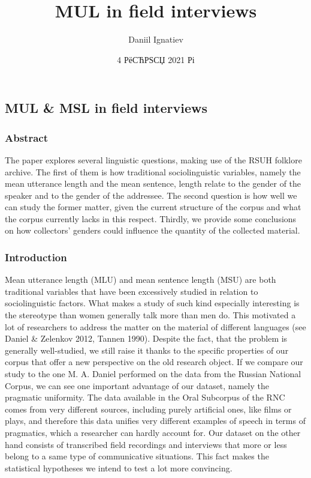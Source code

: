 \documentclass[
]{article}
\title{MUL in field interviews}
\author{Daniil Ignatiev}
\date{4 РёСЋРЅСЏ 2021 Рі}
\begin{document}
\maketitle

\hypertarget{mul-msl-in-field-interviews}{%
\subsection{MUL \& MSL in field
interviews}\label{mul-msl-in-field-interviews}}

\hypertarget{abstract}{%
\subsubsection{Abstract}\label{abstract}}

The paper explores several linguistic questions, making use of the RSUH
folklore archive. The first of them is how traditional sociolinguistic
variables, namely the mean utterance length and the mean sentence,
length relate to the gender of the speaker and to the gender of the
addressee. The second question is how well we can study the former
matter, given the current structure of the corpus and what the corpus
currently lacks in this respect. Thirdly, we provide some conclusions on
how collectors' genders could influence the quantity of the collected
material.

\hypertarget{introduction}{%
\subsubsection{Introduction}\label{introduction}}

Mean utterance length (MLU) and mean sentence length (MSU) are both
traditional variables that have been excessively studied in relation to
sociolinguistic factors. What makes a study of such kind especially
interesting is the stereotype than women generally talk more than men
do. This motivated a lot of researchers to address the matter on the
material of different languages (see Daniel \& Zelenkov 2012, Tannen
1990). Despite the fact, that the problem is generally well-studied, we
still raise it thanks to the specific properties of our corpus that
offer a new perspective on the old research object. If we compare our
study to the one M. A. Daniel performed on the data from the Russian
National Corpus, we can see one important advantage of our dataset,
namely the pragmatic uniformity. The data available in the Oral
Subcorpus of the RNC comes from very different sources, including purely
artificial ones, like films or plays, and therefore this data unifies
very different examples of speech in terms of pragmatics, which a
researcher can hardly account for. Our dataset on the other hand
consists of transcribed field recordings and interviews that more or
less belong to a same type of communicative situations. This fact makes
the statistical hypotheses we intend to test a lot more convincing.
\end{document}
